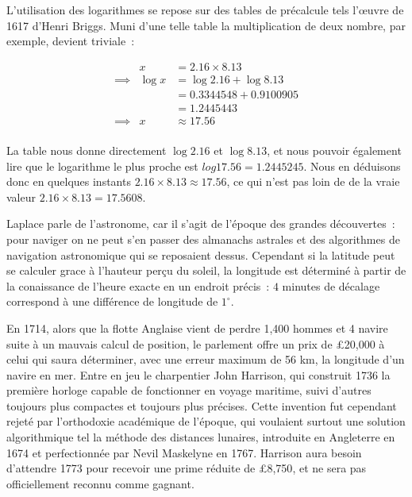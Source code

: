 L'utilisation des logarithmes se repose sur des tables de précalcule tels l'\oe{}uvre de 1617 d'Henri Briggs. Muni d'une telle table la multiplication de deux nombre, par exemple, devient triviale~:

\begin{eqnarray}
                    &x            &= 2.16\times{8.13}              \nonumber \\
        \implies{}  &\log{x}      &= \log{2.16}+\log{8.13}         \nonumber \\
                    &             &= 0.3344548 + 0.9100905         \nonumber \\
                    &             &= 1.2445443                     \nonumber \\
        \implies{}  &x            &\approx{17.56}                   \nonumber \\
\end{eqnarray}

La table nous donne directement $\log{2.16}$ et $\log{8.13}$, et nous pouvoir également lire que le logarithme le plus proche est $log{17.56} = 1.2445245$. Nous en déduisons donc en quelques instants $2.16\times{8.13} \approx{17.56}$, ce qui n'est pas loin de de la vraie valeur $2.16\times{8.13}={17.5608}$.

Laplace parle de l'astronome, car il s'agit de l'époque des grandes découvertes~: pour naviger on ne peut s'en passer des almanachs astrales et des algorithmes de navigation astronomique qui se reposaient dessus. Cependant si la latitude peut se calculer grace à l'hauteur perçu du soleil, la longitude est déterminé à partir de la conaissance de l'heure exacte en un endroit précis~: $4$ minutes de décalage correspond à une différence de longitude de $1^{\circ}$.  

En 1714, alors que la flotte Anglaise vient de perdre 1,400 hommes et 4 navire suite à un mauvais calcul de position, le parlement offre un prix de \pounds{20,000} à celui qui saura déterminer, avec une erreur maximum de 56 km, la longitude d'un navire en mer\cite{longitude}. Entre en jeu le charpentier John Harrison, qui construit 1736 la première horloge capable de fonctionner en voyage maritime, suivi d'autres toujours plus compactes et toujours plus précises. Cette invention fut cependant rejeté par l'orthodoxie académique de l'époque, qui voulaient surtout une solution algorithmique tel la méthode des distances lunaires, introduite en Angleterre en 1674 et perfectionnée par Nevil Maskelyne en 1767\cite{history-longitude}. Harrison aura besoin d'attendre 1773 pour recevoir une prime réduite de \pounds{8,750}, et ne sera pas officiellement reconnu comme gagnant.

